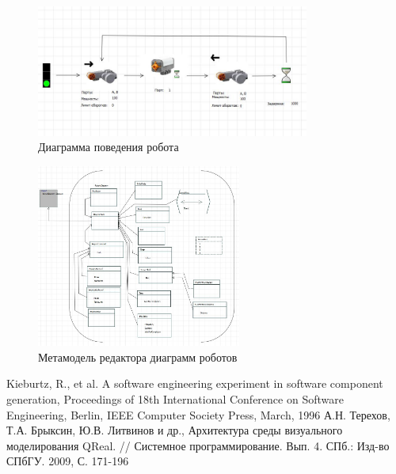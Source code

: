 \documentclass[a4paper]{article}
\begin{document}
\begin{figure} [ht]
  \begin{center}
    \includegraphics[width=0.8\textwidth]{robotsDiagram.jpg}
    \caption{Диаграмма поведения робота}
    \label{robotsDiagram}
  \end{center}
\end{figure}

\begin{figure} [ht]
  \begin{center}
    \includegraphics[width=0.6\textwidth]{robotsMetamodel.jpg}
    \caption{Метамодель редактора диаграмм роботов}
    \label{robotsMetamodel}
  \end{center}
\end{figure}

\begin{thebibliography}{9001}
	 Kieburtz, R., et al. A software engineering experiment in software component generation, Proceedings of 18th International Conference on Software Engineering, Berlin, IEEE Computer Society Press, March, 1996
   А.Н. Терехов, Т.А. Брыксин, Ю.В. Литвинов и др., Архитектура среды визуального моделирования QReal. // Системное программирование. Вып. 4. СПб.: Изд-во СПбГУ. 2009, С. 171-196
\end{thebibliography}
\end{document}
